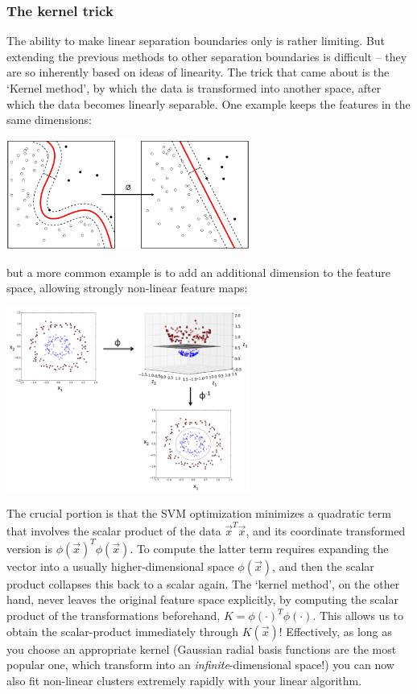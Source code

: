 \documentclass{article}
\begin{document}
\subsubsection{The kernel trick}
The ability to make linear separation boundaries only is rather limiting. But extending the previous methods to other separation boundaries is difficult -- they are so inherently based on ideas of linearity. The trick that came about is the `Kernel method', by which the data is transformed into another space, after which the data becomes linearly separable. One example keeps the features in the same dimensions:
\begin{center}
    \includegraphics[width=0.6\textwidth]{kernel.png}
\end{center}
but a more common example is to add an additional dimension to the feature space, allowing strongly non-linear feature maps:
\begin{center}
    \includegraphics[width=0.6\textwidth]{kernel-method-nonlinear-svm.png}
\end{center}
The crucial portion is that the SVM optimization minimizes a quadratic term that involves the scalar product of the data $\vec{x}^T\vec{x}$, and its coordinate transformed version is $\phi(\vec{x})^T\phi(\vec{x})$. To compute the latter term requires expanding the vector into a usually higher-dimensional space $\phi(\vec{x})$, and then the scalar product collapses this back to a scalar again. The `kernel method', on the other hand, never leaves the original feature space explicitly, by computing the scalar product of the transformations beforehand, $K=\phi(\cdot)^T\phi(\cdot)$. This allows us to obtain the scalar-product immediately through $K(\vec{x})$! Effectively, as long as you choose an appropriate kernel (Gaussian radial basis functions are the most popular one, which transform into an \textit{infinite}-dimensional space!) you can now also fit non-linear clusters extremely rapidly with your linear algorithm.
\end{document}
